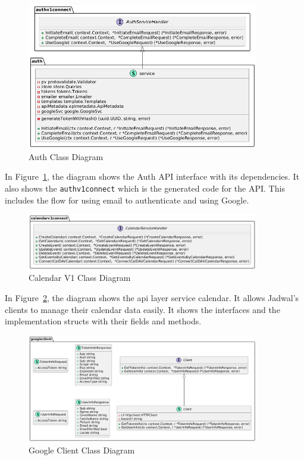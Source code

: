 \begin{figure}[!h]
    \centering
    \includegraphics[width=0.9\textwidth]{images/docs/diagrams/class/class-diagram/auth.png}
    \caption{Auth Class Diagram}
    \label{fig:auth-class-diagram}
\end{figure}

In Figure~\ref{fig:auth-class-diagram}, the diagram shows the Auth API interface with its dependencies.
It also shows the \texttt{authv1connect} which is the generated code for the API\@.
This includes the flow for using email to authenticate and using Google.



\begin{figure}[!h]
    \centering
    \includegraphics[width=0.9\textwidth]{images/docs/diagrams/class/class-diagram/calendarv1.png}
    \caption{Calendar V1 Class Diagram}
    \label{fig:calendar-v1-class-diagram}
\end{figure}

In Figure~\ref{fig:calendar-v1-class-diagram}, the diagram shows the api layer service calendar.
It allows Jadwal's clients to manage their calendar data easily.
It shows the interfaces and the implementation structs with their fields and methods.



\begin{figure}[!h]
    \centering
    \includegraphics[width=0.9\textwidth]{images/docs/diagrams/class/class-diagram/googleclient.png}
    \caption{Google Client Class Diagram}
    \label{fig:googleclient-class-diagram}
\end{figure}

